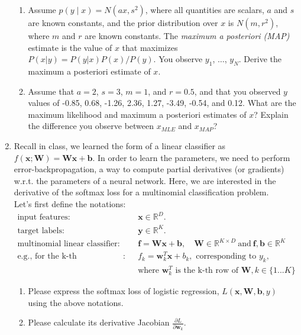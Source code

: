 \documentclass[a4paper]{article}
\begin{document}
\begin{enumerate}
\begin{enumerate}
\item Assume $p(y \mid x) = N(ax, s^2)$, where all quantities are scalars, $a$ and $s$ are known constants, and the prior distribution over $x$ is $N(m,r^2)$, where $m$ and $r$ are known constants. The {\it maximum a posteriori (MAP)} estimate is the value of $x$ that maximizes $P(x | y) = P( y | x) P(x)/P(y).$ You observe $y_1$, $\ldots$, $y_N$. Derive the maximum a posteriori estimate of $x$.\\

\item Assume that $a = 2$, $s = 3$, $m = 1$, and $r = 0.5$, and that you observed $y$ values of -0.85, 0.68, -1.26, 2.36, 1.27, -3.49, -0.54, and 0.12. What are the maximum likelihood and maximum a posteriori estimates of $x$? Explain the difference you observe between $x_{MLE}$ and $x_{MAP}$? 

\end{enumerate}

\item Recall in class, we learned the form of a linear classifier as $f(\bm{x}; \bm{W}) =  \bm{W}\bm{x}+\bm{b}$. In order to learn the parameters, we need to perform error-backpropagation, a way to compute partial derivatives (or gradients) w.r.t. the parameters of a neural network. Here, we are interested in the derivative of the softmax loss for a multinomial classification problem. \\
Let's first define the notations:
\begin{align*}
	\text{input features}: & \quad \bm{x} \in \mathbb{R}^D.\\
	\text{target labels}: & \quad \bm{y} \in \mathbb{R}^K.\\
	\text{multinomial linear classifier}: & \quad \bm{f} = \bm{W}\bm{x} + \bm{b}, \quad \bm{W} \in \mathbb{R}^{K \times D}\ \text{and}\ \bm{f}, \bm{b} \in \mathbb{R}^K\\
	\text{e.g., for the k-th classification}: & \quad f_k = \bm{w}_k^T \bm{x} + b_k, \text{ corresponding to } y_k,\\
								&\quad \text{where } \bm{w}^T_k \text{ is the k-th row of } \bm{W}, k \in \{1...K\}  
\end{align*}
\begin{enumerate}
	\item Please express the softmax loss of logistic regression, $L(\bm{x}, \bm{W}, \bm{b}, y)$ using the above notations.
	\item Please calculate its derivative Jacobian $\frac{\partial L}{\partial \bm{w}_k}$.
\end{enumerate}


\end{enumerate}
\end{document}
